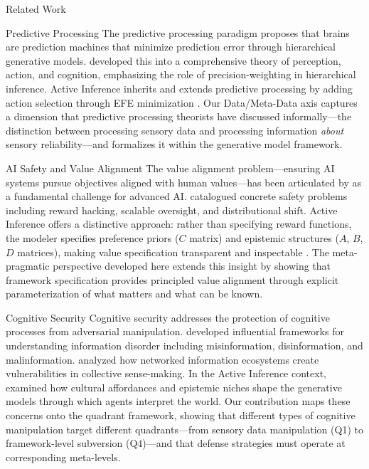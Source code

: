 \documentclass[
  ignorenonframetext,
]{beamer}
\begin{document}
\begin{frame}{Related Work}
\begin{block}{Predictive Processing}
\protect{}\label{predictive-processing}
The predictive processing paradigm \cite{clark2013whatever} proposes
that brains are prediction machines that minimize prediction error
through hierarchical generative models. \cite{hohwy2013predictive}
developed this into a comprehensive theory of perception, action, and
cognition, emphasizing the role of precision-weighting in hierarchical
inference. Active Inference inherits and extends predictive processing
by adding action selection through EFE minimization
\cite{friston2015active}. Our Data/Meta-Data axis captures a dimension
that predictive processing theorists have discussed informally---the
distinction between processing sensory data and processing information
\emph{about} sensory reliability---and formalizes it within the
generative model framework.
\end{block}

\begin{block}{AI Safety and Value Alignment}
\protect{}\label{ai-safety-and-value-alignment}
The value alignment problem---ensuring AI systems pursue objectives
aligned with human values---has been articulated by
\cite{russell2019human} as a fundamental challenge for advanced AI.
\cite{amodei2016concrete} catalogued concrete safety problems including
reward hacking, scalable oversight, and distributional shift. Active
Inference offers a distinctive approach: rather than specifying reward
functions, the modeler specifies preference priors (\(C\) matrix) and
epistemic structures (\(A\), \(B\), \(D\) matrices), making value
specification transparent and inspectable \cite{sajid2022active}. The
meta-pragmatic perspective developed here extends this insight by
showing that framework specification provides principled value alignment
through explicit parameterization of what matters and what can be known.
\end{block}

\begin{block}{Cognitive Security}
\protect{}\label{cognitive-security}
Cognitive security addresses the protection of cognitive processes from
adversarial manipulation. \cite{wardle2017information} developed
influential frameworks for understanding information disorder including
misinformation, disinformation, and malinformation.
\cite{benkler2018network} analyzed how networked information ecosystems
create vulnerabilities in collective sense-making. In the Active
Inference context, \cite{constant2019regimes} examined how cultural
affordances and epistemic niches shape the generative models through
which agents interpret the world. Our contribution maps these concerns
onto the quadrant framework, showing that different types of cognitive
manipulation target different quadrants---from sensory data manipulation
(Q1) to framework-level subversion (Q4)---and that defense strategies
must operate at corresponding meta-levels.
\end{block}


\end{frame}
\end{document}
